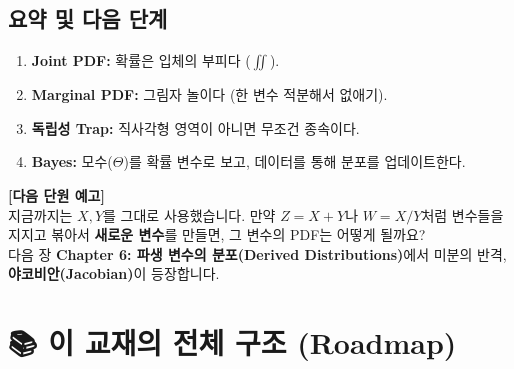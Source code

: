 \documentclass[11pt,a4paper]{book}
\theoremstyle{definition}
\begin{document}
\section{요약 및 다음 단계}

\begin{tcolorbox}[colback=mainblue!10, colframe=mainblue, title={\textbf{📝 Unit 2-2 핵심 요약}}]
\begin{enumerate}
    \item \textbf{Joint PDF:} 확률은 입체의 부피다 ($\iint$).
    \item \textbf{Marginal PDF:} 그림자 놀이다 (한 변수 적분해서 없애기).
    \item \textbf{독립성 Trap:} 직사각형 영역이 아니면 무조건 종속이다.
    \item \textbf{Bayes:} 모수($\Theta$)를 확률 변수로 보고, 데이터를 통해 분포를 업데이트한다.
\end{enumerate}
\end{tcolorbox}

\vspace{0.5cm}
\textbf{[다음 단원 예고]} \\
지금까지는 $X, Y$를 그대로 사용했습니다. 만약 $Z = X + Y$나 $W = X/Y$처럼 변수들을 지지고 볶아서 \textbf{새로운 변수}를 만들면, 그 변수의 PDF는 어떻게 될까요? \\
다음 장 \textbf{Chapter 6: 파생 변수의 분포(Derived Distributions)}에서 미분의 반격, \textbf{야코비안(Jacobian)}이 등장합니다.


\chapter{📚 이 교재의 전체 구조 (Roadmap)}
\label{ch:lecture6}

\end{document}

